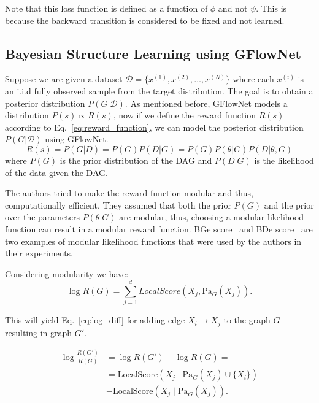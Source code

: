 \documentclass{lxaiproposal}
\begin{document}
    Note that this loss function is defined as a function of $\phi$ and not $\psi$. This is because the backward
    transition is considered to be fixed and not learned.

    \subsection{Bayesian Structure Learning using GFlowNet}

    Suppose we are given a dataset $\mathcal{D} = \{x^{(1)}, x^{(2)}, \ldots, x^{(N)}\}$ where each $x^{(i)}$ is an i.i.d
    fully observed sample from the target distribution. The goal is to obtain a posterior distribution
    $P(G|\mathcal{D})$.
    As mentioned before, GFlowNet models a distribution $P(s) \propto R(s)$, now if we define the reward function $R(s)$
    according to Eq.~\eqref{eq:reward_function}, we can model the posterior distribution $P(G|\mathcal{D})$ using
    GFlowNet.
    \begin{equation}
        R(s) = P(G|D) = P(G)P(D|G) = P(G) P(\theta|G) P(D|\theta, G)
        \label{eq:reward_function}
    \end{equation}
    where $P(G)$ is the prior distribution of the DAG and $P(D|G)$ is the likelihood of the data given the DAG.

    The authors tried to make the reward function modular and thus, computationally efficient. They assumed that both the
    prior $P(G)$ and the prior over the parameters $P(\theta|G)$ are modular, thus, choosing a modular likelihood
    function can result in a modular reward function. BGe score~\cite{geiger2021learninggaussiannetworks} and
    BDe score~\cite{heckerman2015learningbayesiannetworkscombination} are two examples of modular likelihood functions that
    were used by the authors in their experiments.

    Considering modularity we have:
    \begin{equation}
        \log R(G) = \sum_{j=1}^{d} LocalScore(X_j, \text{Pa}_G(X_j)).
        \label{eq:modular_reward}
    \end{equation}

    This will yield Eq.~\eqref{eq:log_diff} for adding edge $X_i \to X_j$ to the graph $G$ resulting in graph $G'$.

    \begin{equation}
        \begin{aligned}
            \log \frac{R(G')}{R(G)} &= \log R(G') - \log R(G) =\\
            & = \text{LocalScore}(X_j \mid \text{Pa}_{G}(X_j)\cup \{X_i\}) \\
            &-\text{LocalScore}(X_j \mid \text{Pa}_{G}(X_j)).
        \end{aligned}
        \label{eq:log_diff}
    \end{equation}
\end{document}
